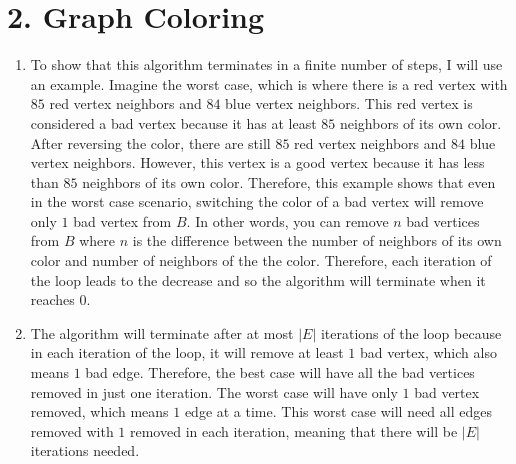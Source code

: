 \documentclass[11pt]{article}
\begin{document}
\newpage
\section*{2.  Graph Coloring}
\begin{enumerate}[label=(\alph*)]
\item
To show that this algorithm terminates in a finite number of steps, I will use an example. Imagine the worst case, which is where there is a red vertex with $85$ red vertex neighbors and $84$ blue vertex neighbors. This red vertex is considered a bad vertex because it has at least $85$ neighbors of its own color. After reversing the color, there are still $85$ red vertex neighbors and $84$ blue vertex neighbors. However, this vertex is a good vertex because it has less than $85$ neighbors of its own color. Therefore, this example shows that even in the worst case scenario, switching the color of a bad vertex will remove only $1$ bad vertex from $B$. In other words, you can remove $n$ bad vertices from $B$ where $n$ is the difference between the number of neighbors of its own color and number of neighbors of the the color. Therefore, each iteration of the loop leads to the decrease and so the algorithm will terminate when it reaches $0$.

\item
The algorithm will terminate after at most $|E|$ iterations of the loop because in each iteration of the loop, it will remove at least $1$ bad vertex, which also means $1$ bad edge. Therefore, the best case will have all the bad vertices removed in just one iteration. The worst case will have only $1$ bad vertex removed, which means $1$ edge at a time. This worst case will need all edges removed with $1$ removed in each iteration, meaning that there will be $|E|$ iterations needed.

\end{enumerate}



\newpage
\end{document}
